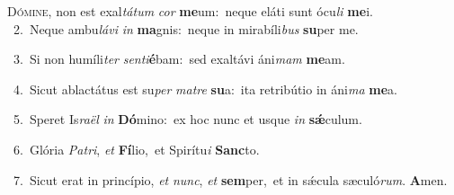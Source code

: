 \lettrine{\initial\textcolor{\initialcolor}{D}}{ómine,} non est exal\-\textit{tá}\-\textit{tum} \textit{cor} \textbf{me}\-um:~\star neque eláti sunt ócu\textit{li} \textbf{me}\-i.\\
{\numbfont\textcolor{\numbcolor}{~2.}}~Neque ambu\-\textit{lá}\-\textit{vi} \textit{in} \textbf{ma}\-gnis:~\star neque in mirabíli\textit{bus} \textbf{su}\-per me.\par
{\numbfont\textcolor{\numbcolor}{~3.}}~Si non humíli\textit{ter} \textit{sen}\-\textit{ti}\textbf{é}bam:~\star sed exaltávi áni\textit{mam} \textbf{me}\-am.\par
{\numbfont\textcolor{\numbcolor}{~4.}}~Sicut ablactátus est su\textit{per} \textit{ma}\-\textit{tre} \textbf{su}\-a:~\star ita retribútio in áni\textit{ma} \textbf{me}\-a.\par
{\numbfont\textcolor{\numbcolor}{~5.}}~Speret Is\-\textit{ra}\-\textit{ël} \textit{in} \textbf{Dó}\-mino:~\star ex hoc nunc et usque \textit{in} \textbf{sǽ}\-culum.\par
{\numbfont\textcolor{\numbcolor}{~6.}}~Glória \textit{Pa}\-\textit{tri}, \textit{et} \textbf{Fí}\-lio,~\star et Spirítu\textit{i} \textbf{Sanc}\-to.\par
{\numbfont\textcolor{\numbcolor}{~7.}}~Sicut erat in princípio, \textit{et} \textit{nunc}\-, \textit{et} \textbf{sem}\-per,~\star et in sǽcula sæculó\-\textit{rum}\-. \textbf{A}\-men.\par
